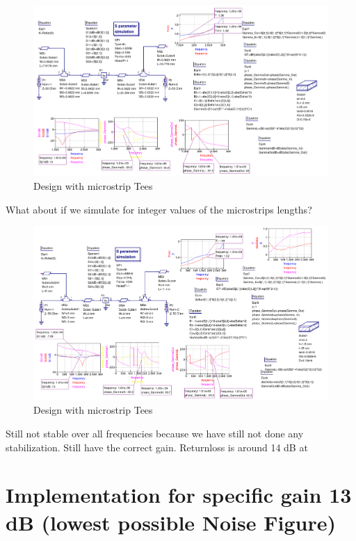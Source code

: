 \documentclass{article}
\begin{document}
\begin{figure}[H]
\centering
  \includegraphics[width=\linewidth]{TEE1800MHzAt13dBAt2dBNFSweep.png}
  \caption{Design with microstrip Tees}
  \label{fig4}
\end{figure}

What about if we simulate for integer values of the microstrips lengths?
\begin{figure}[H]
\centering
  \includegraphics[width=\linewidth]{TEE1800MHzAt13dBAt2dBNFSweep2.png}
  \caption{Design with microstrip Tees}
  \label{fig4}
\end{figure}
Still not stable over all frequencies because we have still not done
any stabilization. Still have the correct gain. Returnloss is around 14 dB at

\section{Implementation for specific gain 13 dB (lowest possible Noise Figure)}
\end{document}

